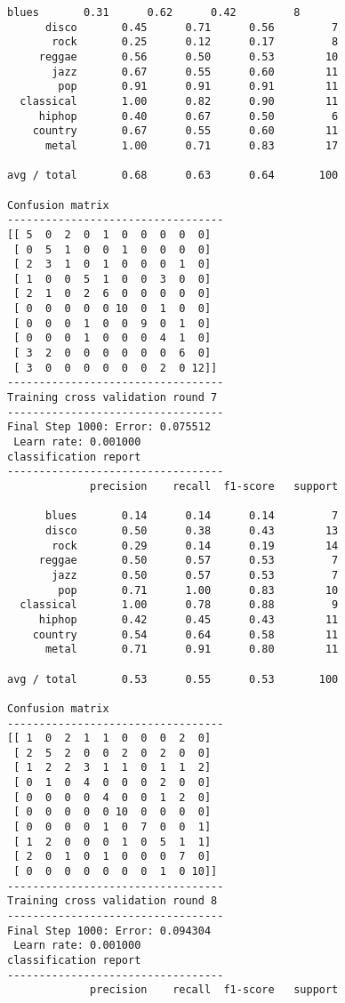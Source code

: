 \documentclass{article}
\begin{document}
\begin{Verbatim}[commandchars=\\\{\}]
      blues       0.31      0.62      0.42         8
      disco       0.45      0.71      0.56         7
       rock       0.25      0.12      0.17         8
     reggae       0.56      0.50      0.53        10
       jazz       0.67      0.55      0.60        11
        pop       0.91      0.91      0.91        11
  classical       1.00      0.82      0.90        11
     hiphop       0.40      0.67      0.50         6
    country       0.67      0.55      0.60        11
      metal       1.00      0.71      0.83        17

avg / total       0.68      0.63      0.64       100

Confusion matrix
----------------------------------
[[ 5  0  2  0  1  0  0  0  0  0]
 [ 0  5  1  0  0  1  0  0  0  0]
 [ 2  3  1  0  1  0  0  0  1  0]
 [ 1  0  0  5  1  0  0  3  0  0]
 [ 2  1  0  2  6  0  0  0  0  0]
 [ 0  0  0  0  0 10  0  1  0  0]
 [ 0  0  0  1  0  0  9  0  1  0]
 [ 0  0  0  1  0  0  0  4  1  0]
 [ 3  2  0  0  0  0  0  0  6  0]
 [ 3  0  0  0  0  0  0  2  0 12]]
----------------------------------
Training cross validation round 7
----------------------------------
Final Step 1000: Error: 0.075512 
 Learn rate: 0.001000
classification report 
----------------------------------
             precision    recall  f1-score   support

      blues       0.14      0.14      0.14         7
      disco       0.50      0.38      0.43        13
       rock       0.29      0.14      0.19        14
     reggae       0.50      0.57      0.53         7
       jazz       0.50      0.57      0.53         7
        pop       0.71      1.00      0.83        10
  classical       1.00      0.78      0.88         9
     hiphop       0.42      0.45      0.43        11
    country       0.54      0.64      0.58        11
      metal       0.71      0.91      0.80        11

avg / total       0.53      0.55      0.53       100

Confusion matrix
----------------------------------
[[ 1  0  2  1  1  0  0  0  2  0]
 [ 2  5  2  0  0  2  0  2  0  0]
 [ 1  2  2  3  1  1  0  1  1  2]
 [ 0  1  0  4  0  0  0  2  0  0]
 [ 0  0  0  0  4  0  0  1  2  0]
 [ 0  0  0  0  0 10  0  0  0  0]
 [ 0  0  0  0  1  0  7  0  0  1]
 [ 1  2  0  0  0  1  0  5  1  1]
 [ 2  0  1  0  1  0  0  0  7  0]
 [ 0  0  0  0  0  0  0  1  0 10]]
----------------------------------
Training cross validation round 8
----------------------------------
Final Step 1000: Error: 0.094304 
 Learn rate: 0.001000
classification report 
----------------------------------
             precision    recall  f1-score   support


\end{Verbatim}
\end{document}
